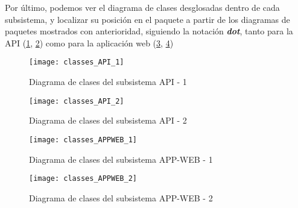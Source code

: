 Por último, podemos ver el diagrama de clases desglosadas dentro de cada subsistema, y localizar su posición en el paquete a partir de los diagramas de paquetes mostrados con anterioridad, siguiendo la notación \textit{\textbf{dot}}, tanto para la API (\ref{fig:classes_API_1}, \ref{fig:classes_API_2}) como para la aplicación web (\ref{fig:classes_APPWEB_1}, \ref{fig:classes_APPWEB_2})

\begin{landscape}
\begin{figure}
    \centering
    \texttt{[image: classes\_API\_1]}
    \caption{Diagrama de clases del subsistema API - 1}
    \label{fig:classes_API_1}
\end{figure}
\begin{figure}
    \centering
    \texttt{[image: classes\_API\_2]}
    \caption{Diagrama de clases del subsistema API - 2}
    \label{fig:classes_API_2}
\end{figure}
\end{landscape}

\begin{landscape}
\begin{figure}
    \centering
    \texttt{[image: classes\_APPWEB\_1]}
    \caption{Diagrama de clases del subsistema APP-WEB - 1}
    \label{fig:classes_APPWEB_1}
\end{figure}
\begin{figure}
    \centering
    \texttt{[image: classes\_APPWEB\_2]}
    \caption{Diagrama de clases del subsistema APP-WEB - 2}
    \label{fig:classes_APPWEB_2}
\end{figure}
\end{landscape}

